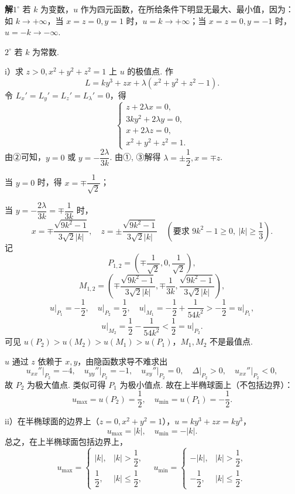 \documentclass[UTF8,12pt,a4paper,fontset=fandol]{ctexart}
\begin{document}
\noindent\textbf{解}\quad $1^\circ$ 若 $k$ 为变数，$u$ 作为四元函数，在所给条件下明显无最大、最小值，因为：如 $k\to+\infty$，当 $x=z=0,y=1$ 时，$u=k\to+\infty$；当 $x=z=0,y=-1$ 时，$u=-k\to-\infty$.

$2^\circ$ 若 $k$ 为常数.

i）求 $z>0,x^2+y^2+z^2=1$ 上 $u$ 的极值点. 作
\[
  L=ky^3+zx+\lambda(x^2+y^2+z^2-1).
\]
令 $L_x'=L_y'=L_z'=L_\lambda'=0$，得
\[
  \begin{cases}
    z+2\lambda x=0,\\
    3ky^2+2\lambda y=0,\\
    x+2\lambda z=0,\\
    x^2+y^2+z^2=1.
  \end{cases}
\]
由②可知，$y=0$ 或 $y=-\dfrac{2\lambda}{3k}$. 由①, ③解得 $\lambda=\pm\dfrac12,x=\mp z$.

当 $y=0$ 时，得 $x=\mp\dfrac1{\sqrt2}$；

当 $y=-\dfrac{2\lambda}{3k}=\mp\dfrac1{3k}$ 时，
\[
  x=\mp\frac{\sqrt{9k^2-1}}{3\sqrt2|k|},\quad
  z=\pm\frac{\sqrt{9k^2-1}}{3\sqrt2|k|}
  \quad(\text{要求 }9k^2-1\ge0,\ |k|\ge\frac13).
\]
记
\[
  P_{1,2}=\left(\mp\frac1{\sqrt2},0,\frac1{\sqrt2}\right),
\]
\[
  M_{1,2}=\left(\mp\frac{\sqrt{9k^2-1}}{3\sqrt2|k|},
  \mp\frac1{3k},
  \frac{\sqrt{9k^2-1}}{3\sqrt2|k|}\right),
\]
\[
  u\big|_{P_1}=-\frac12,\quad
  u\big|_{P_2}=\frac12,\quad
  u\big|_{M_1}=-\frac12+\frac1{54k^2}>-\frac12=u\big|_{P_1},
\]
\[
  u\big|_{M_2}=\frac12-\frac1{54k^2}<\frac12=u\big|_{P_2}.
\]
可见 $u(P_2)>u(M_2)>u(M_1)>u(P_1)$，$M_1,M_2$ 不是最值点.

$u$ 通过 $z$ 依赖于 $x,y$，由隐函数求导不难求出
\[
  u_{xx}''\big|_{P_2}=-4,\quad
  u_{yy}''\big|_{P_2}=-1,\quad
  u_{xy}''\big|_{P_2}=0,\quad
  \Delta\big|_{P_2}>0,\quad
  u_{xx}''\big|_{P_2}<0,
\]
故 $P_2$ 为极大值点. 类似可得 $P_1$ 为极小值点. 故在上半椭球面上（不包括边界）：
\[
  u_{\max}=u(P_2)=\frac12,\quad
  u_{\min}=u(P_1)=-\frac12.
\]

ii）在半椭球面的边界上（$z=0,x^2+y^2=1$），$u=ky^3+zx=ky^3$，
\[
  u_{\max}=|k|,\quad u_{\min}=-|k|.
\]
总之，在上半椭球面包括边界上，
\[
  u_{\max}=
  \begin{cases}
    |k|, & |k|>\dfrac12,\\
    \dfrac12, & |k|\le\dfrac12,
  \end{cases}
  \quad
  u_{\min}=
  \begin{cases}
    -|k|, & |k|>\dfrac12,\\
    -\dfrac12, & |k|\le\dfrac12.
  \end{cases}
\]
\end{document}
